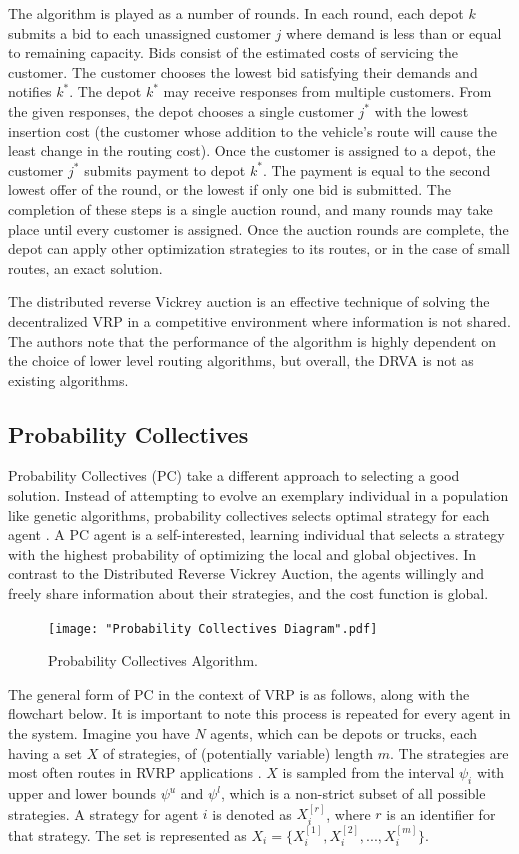 \documentclass{sig-alternate}
\begin{document}
The algorithm is played as a number of rounds. In each round, each depot $k$ submits a bid to each unassigned customer $j$ where demand is less than or equal to remaining capacity. Bids consist of the estimated costs of servicing the customer. The customer chooses the lowest bid satisfying their demands and notifies $k^*$. The depot $k^*$ may receive responses from multiple customers. From the given responses, the depot chooses a single customer $j^*$ with the lowest insertion cost (the customer whose addition to  the vehicle's route will cause the least change  in the routing cost). Once the customer is assigned to a depot, the customer $j^*$ submits payment to depot $k^*$. The payment is equal to the second lowest offer of the round, or the lowest if only one bid is submitted. The completion of these steps is a single auction round, and many rounds may take place until every customer is assigned. Once the auction rounds are complete, the depot can apply other optimization strategies to its routes, or in the case of small routes, an exact solution.

The distributed reverse Vickrey auction is an effective technique of solving the decentralized VRP in a competitive environment where information is not shared. The authors note that the performance of the algorithm is highly dependent on the choice of lower level routing algorithms, but overall, the DRVA is not as existing algorithms.
\subsection{Probability Collectives}
\label{ssec:PC}
Probability Collectives (PC) take a different approach to selecting a good solution. Instead of attempting to evolve an exemplary individual in a population like genetic algorithms, probability collectives selects optimal strategy for each agent \cite{Kulkarni:2008}. A PC agent is a self-interested, learning individual that selects a strategy with the highest probability of optimizing the local and global objectives. In contrast to the Distributed Reverse Vickrey Auction, the agents willingly and freely share information about their strategies, and the cost function is global.

\begin{figure}[h]
\centering
\texttt{[image: "Probability Collectives Diagram".pdf]}
\caption{Probability Collectives Algorithm.}
\label{fig:PCDiagram}
\end{figure}

The general form of PC in the context of VRP is as follows, along with the flowchart below. It is important to note this process is repeated for every agent in the system. Imagine you have $N$ agents, which can be depots or trucks, each having a set $X$ of strategies, of (potentially variable) length $m$. The strategies are most often routes in RVRP applications \cite{Vasirani:2008}. $X$ is sampled from the interval $\psi_i$ with upper and lower bounds $\psi^u$ and $\psi^l$, which is a non-strict subset of all possible strategies. A strategy for agent $i$ is denoted as $X_i^{[r]}$, where $r$ is an identifier for that strategy. The set is represented as $X_i=\{X_i^{[1]}, X_i^{[2]}, ..., X_i^{[m]}\}$. 
\end{document}
